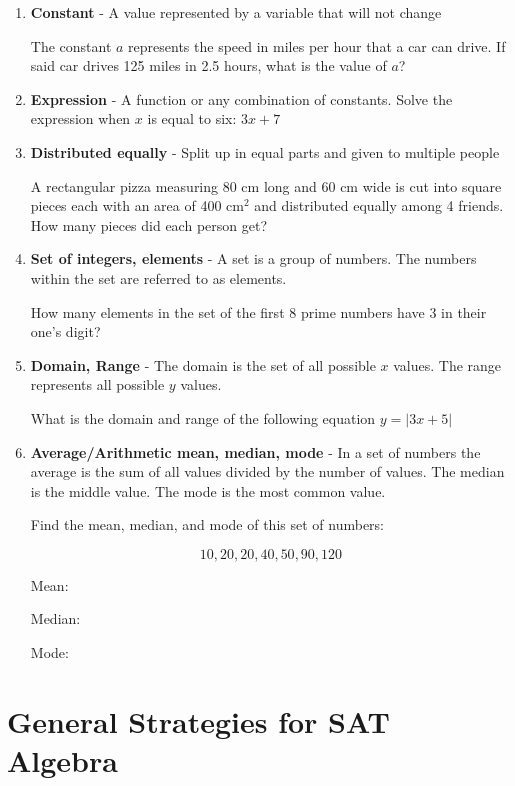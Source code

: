 \documentclass[12pt]{book}
\begin{document}
\begin{enumerate}[label=\bfseries\arabic*.]
\item \textbf{Constant} - A value represented by a variable that will not change

\bigskip
The constant $a$ represents the speed in miles per hour that a car can drive. If said car drives 125 miles in 2.5 hours, what is the value of $a$?

\vfill
\item \textbf{Expression} - A function or any combination of constants. Solve the expression when $x$ is equal to six: $3x+7$

\vfill
\item \textbf{Distributed equally} - Split up in equal parts and given to multiple people

\bigskip
A rectangular pizza measuring 80 cm long and 60 cm wide is cut into square pieces each with an area of 400 cm$^2$ and distributed equally among 4 friends. How many pieces did each person get?

\vfill
\item \textbf{Set of integers, elements} - A set is a group of numbers. The numbers within the set are referred to as elements.

\bigskip
How many elements in the set of the first 8 prime numbers have 3 in their one's digit?

\vfill
\item \textbf{Domain, Range} - The domain is the set of all possible $x$ values. The range represents all possible $y$ values.

\bigskip
What is the domain and range of the following equation $y=|3x+5|$

\vfill
\item \textbf{Average/Arithmetic mean, median, mode} - In a set of numbers the average is the sum of all values divided by the number of values. The median is the middle value. The mode is the most common value.

\bigskip
Find the mean, median, and mode of this set of numbers:

\[10,20,20,40,50,90,120\]

Mean:

\medskip
Median:

\medskip
Mode:
\end{enumerate}

\vfill
\pagebreak
\section[SAT Algebra]{General Strategies for SAT Algebra}
\end{document}
